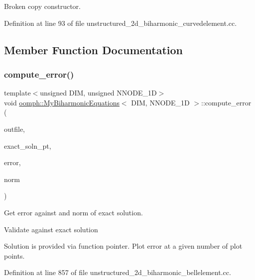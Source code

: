 Broken copy constructor. 



Definition at line 93 of file unstructured\+\_\+2d\+\_\+biharmonic\+\_\+curvedelement.\+cc.



\subsection{Member Function Documentation}
\mbox{\label{classoomph_1_1MyBiharmonicEquations_ac605d044c4e8c0483dcdf9b3b9e6634d}} 
\subsubsection{\texorpdfstring{compute\+\_\+error()}{compute\_error()}\hspace{0.1cm}{\footnotesize\ttfamily [1/4]}}
{\footnotesize\ttfamily template$<$unsigned D\+IM, unsigned N\+N\+O\+D\+E\+\_\+1D$>$ \\
void \hyperlink{classoomph_1_1MyBiharmonicEquations}{oomph\+::\+My\+Biharmonic\+Equations}$<$ D\+IM, N\+N\+O\+D\+E\+\_\+1D $>$\+::compute\+\_\+error (\begin{DoxyParamCaption}\item[{std\+::ostream \&}]{outfile,  }\item[{Finite\+Element\+::\+Steady\+Exact\+Solution\+Fct\+Pt}]{exact\+\_\+soln\+\_\+pt,  }\item[{double \&}]{error,  }\item[{double \&}]{norm }\end{DoxyParamCaption})}



Get error against and norm of exact solution. 

Validate against exact solution

Solution is provided via function pointer. Plot error at a given number of plot points. 

Definition at line 857 of file unstructured\+\_\+2d\+\_\+biharmonic\+\_\+bellelement.\+cc.

\mbox{\label{classoomph_1_1MyBiharmonicEquations_ac605d044c4e8c0483dcdf9b3b9e6634d}} 
